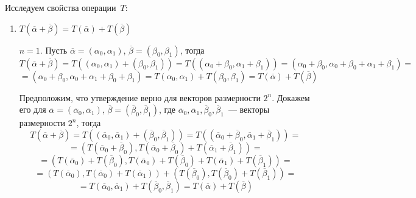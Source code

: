 \begin{enumerate}
	Исследуем свойства операции~$T$:
	\begin{enumerate}
		\item $T(\overline\alpha + \overline\beta) = T(\overline\alpha) + T(\overline\beta)$
		\begin{proofmathind}
			\indbase $n = 1$.
			Пусть $\overline\alpha = (\alpha_0, \alpha_1)$, $\overline\beta = (\beta_0, \beta_1)$, тогда
			\begin{equation*}
			T(\overline\alpha + \overline\beta) =
			T((\alpha_0, \alpha_1) + (\beta_0, \beta_1)) =
			T((\alpha_0 + \beta_0, \alpha_1 + \beta_1)) =
			(\alpha_0 + \beta_0,  \alpha_0 + \beta_0 + \alpha_1 + \beta_1) =
			\end{equation*}
			\begin{equation*}
			= (\alpha_0 + \beta_0,  \alpha_0 + \alpha_1 + \beta_0 + \beta_1) =
			T(\alpha_0, \alpha_1) + T(\beta_0, \beta_1) =
			T(\overline\alpha) + T(\overline\beta)
			\end{equation*}
			
			\indstep Предположим, что утверждение верно для векторов размерности $2^n$.
			Докажем его для $\overline\alpha = (\overline\alpha_0, \overline\alpha_1)$,
			$\overline\beta = (\overline\beta_0, \overline\beta_1)$, где
			$\overline\alpha_0, \overline\alpha_1, \overline\beta_0, \overline\beta_1$~--- векторы размерности $2^n$, тогда
			\begin{equation*}
			T(\overline\alpha + \overline\beta) =
			T((\overline\alpha_0, \overline\alpha_1) + (\overline\beta_0, \overline\beta_1)) =
			T((\overline\alpha_0 + \overline\beta_0, \overline\alpha_1 + \overline\beta_1)) =
			\end{equation*}
			\begin{equation*}
			= (T(\overline\alpha_0 + \overline\beta_0), T(\overline\alpha_0 + \overline\beta_0) + T(\overline\alpha_1 + \overline\beta_1)) =
			\end{equation*}
			\begin{equation*}
			= (T(\overline\alpha_0) + T(\overline\beta_0),  T(\overline\alpha_0) + T(\overline\beta_0) + T(\overline\alpha_1) + T(\overline\beta_1)) =
			\end{equation*}
			\begin{equation*}
			= (T(\overline\alpha_0), T(\overline\alpha_0) + T(\overline\alpha_1)) + (T(\overline\beta_0), T(\overline\beta_0) + T(\overline\beta_1)) =
			\end{equation*}
			\begin{equation*}
			= T(\overline\alpha_0, \overline\alpha_1) + T(\overline\beta_0, \overline\beta_1) =
			T(\overline\alpha) + T(\overline\beta)
			\end{equation*}
			\indend
		\end{proofmathind}
		

\end{enumerate}
\end{enumerate}
